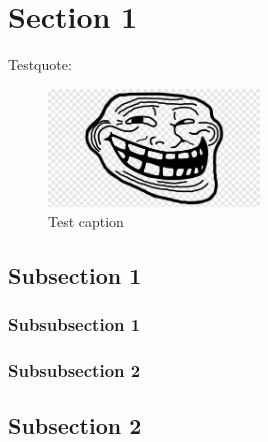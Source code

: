 \section{Section 1}
Testquote: \cite*{MSI:Radars}
\begin{figure}[H]
    \centering
    \includegraphics[width=0.5\textwidth]{Figures/place_holder.png}
    \caption{Test caption}
\end{figure}

\subsection{Subsection 1}
\subsubsection{Subsubsection 1}
\subsubsection{Subsubsection 2}
\subsection{Subsection 2}